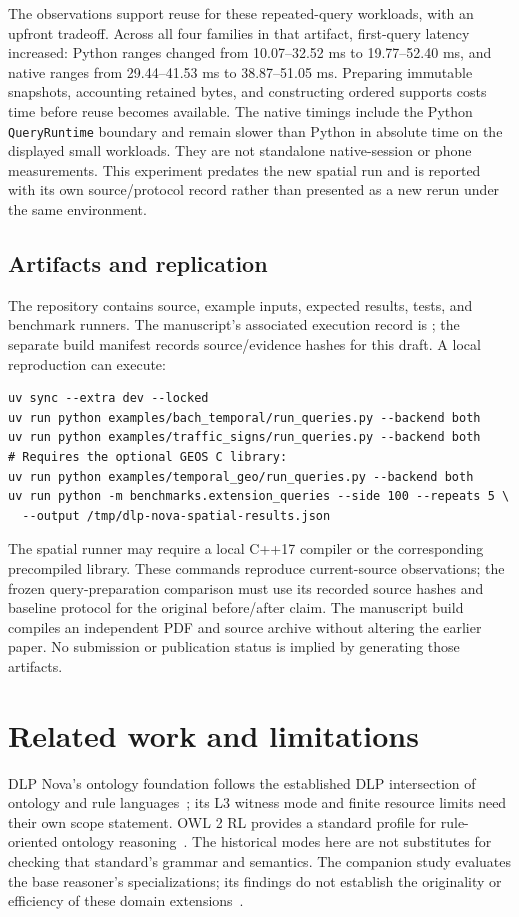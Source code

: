 \documentclass{article}
\newcommand{\code}[1]{\texttt{#1}}
\begin{document}
The observations support reuse for these repeated-query workloads, with an
upfront tradeoff. Across all four families in that artifact, first-query latency
increased: Python ranges changed from 10.07--32.52 ms to 19.77--52.40 ms, and
native ranges from 29.44--41.53 ms to 38.87--51.05 ms. Preparing immutable
snapshots, accounting retained bytes, and constructing ordered supports costs
time before reuse becomes available. The native timings include the Python
\code{QueryRuntime} boundary and remain slower than Python in absolute time
on the displayed small workloads. They are not standalone native-session or
phone measurements. This experiment predates the new spatial run and is
reported with its own source/protocol record rather than presented as a new
rerun under the same environment.

\subsection{Artifacts and replication}
The repository contains source, example inputs, expected results, tests, and
benchmark runners. The manuscript's associated execution record is
; the separate build manifest records
source/evidence hashes for this draft. A local reproduction can execute:
\begin{lstlisting}
uv sync --extra dev --locked
uv run python examples/bach_temporal/run_queries.py --backend both
uv run python examples/traffic_signs/run_queries.py --backend both
# Requires the optional GEOS C library:
uv run python examples/temporal_geo/run_queries.py --backend both
uv run python -m benchmarks.extension_queries --side 100 --repeats 5 \
  --output /tmp/dlp-nova-spatial-results.json
\end{lstlisting}
The spatial runner may require a local C++17 compiler or the corresponding
precompiled library. These commands reproduce current-source observations;
the frozen query-preparation comparison must use its recorded source hashes
and baseline protocol for the original before/after claim. The manuscript
build compiles an independent PDF and source archive without altering the
earlier paper. No submission or publication status is implied by generating
those artifacts.

\section{Related work and limitations}
DLP Nova's ontology foundation follows the established DLP intersection of
ontology and rule languages~\cite{grosof2003,volz2004}; its L3 witness mode and
finite resource limits need their own scope statement. OWL 2 RL provides a
standard profile for rule-oriented ontology reasoning~\cite{owlprofiles2012}.
The historical modes here are not substitutes for checking that standard's
grammar and semantics. The companion study evaluates the base reasoner's
specializations; its findings do not establish the originality or efficiency
of these domain extensions~\cite{dlprevisited2026}.
\end{document}
